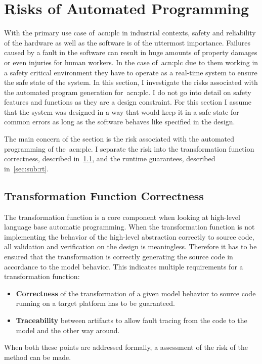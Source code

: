 \section{Risks of Automated Programming}
\label{sec:risks}

With the primary use case of~\acrshort{acn:plc} in industrial contexts, safety and reliability of the hardware as well as the software is of the uttermost importance.
Failures caused by a fault in the software can result in huge amounts of property damages or even injuries for human workers.
In the case of~\acrshort{acn:plc} due to them working in a safety critical environment they have to operate as a real-time system to ensure the safe state of the system.
In this section, I investigate the risks associated with the automated program generation for~\acrshort{acn:plc}.
I do not go into detail on safety features and functions as they are a design constraint.
For this section I assume that the system was designed in a way that would keep it in a safe state for common errors as long as the software behaves like specified in the design.

The main concern of the section is the risk associated with the automated programming of the~\acrshort{acn:plc}.
I separate the risk into the transformation function correctness, described in~\ref{sec:sub:trans}, and the runtime guarantees, described in~\ref{sec:sub:rt}. 
\subsection{Transformation Function Correctness}
\label{sec:sub:trans}
The transformation function is a core component when looking at high-level language base automatic programming.
When the transformation function is not implementing the behavior of the high-level abstraction correctly to source code, all validation and verification on the design is meaningless.
Therefore it has to be ensured that the transformation is correctly generating the source code in accordance to the model behavior.
This indicates multiple requirements for a transformation function:
\begin{itemize}
	\item \textbf{Correctness} of the transformation of a given model behavior to source code running on a target platform has to be guaranteed.
	\item \textbf{Traceability} between artifacts to allow fault tracing from the code to the model and the other way around. 
\end{itemize}
When both these points are addressed formally, a assessment of the risk of the method can be made.

